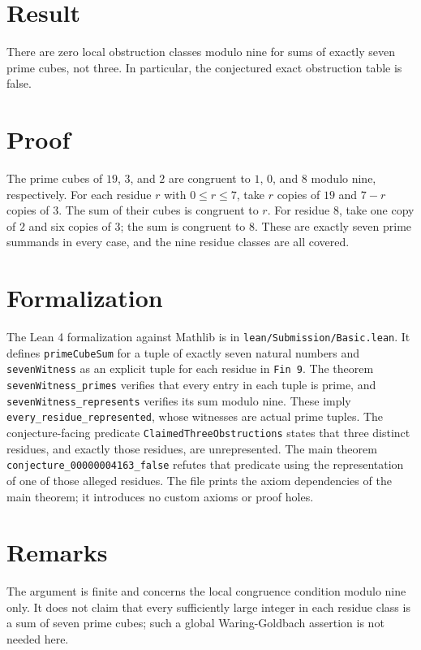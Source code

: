 \documentclass[11pt]{article}
\theoremstyle{plain}
\theoremstyle{definition}
\theoremstyle{remark}
\begin{document}
\section{Result}


There are zero local obstruction classes modulo nine for sums of exactly seven prime cubes, not three. In particular, the conjectured exact obstruction table is false.

\section{Proof}

The prime cubes of $19$, $3$, and $2$ are congruent to $1$, $0$, and $8$ modulo nine, respectively. For each residue $r$ with $0\leq r\leq 7$, take $r$ copies of $19$ and $7-r$ copies of $3$. The sum of their cubes is congruent to $r$. For residue $8$, take one copy of $2$ and six copies of $3$; the sum is congruent to $8$. These are exactly seven prime summands in every case, and the nine residue classes are all covered.

\section{Formalization}

The Lean 4 formalization against Mathlib is in \verb|lean/Submission/Basic.lean|. It defines \verb|primeCubeSum| for a tuple of exactly seven natural numbers and \verb|sevenWitness| as an explicit tuple for each residue in \verb|Fin 9|. The theorem \verb|sevenWitness_primes| verifies that every entry in each tuple is prime, and \verb|sevenWitness_represents| verifies its sum modulo nine. These imply \verb|every_residue_represented|, whose witnesses are actual prime tuples. The conjecture-facing predicate \verb|ClaimedThreeObstructions| states that three distinct residues, and exactly those residues, are unrepresented. The main theorem \verb|conjecture_00000004163_false| refutes that predicate using the representation of one of those alleged residues. The file prints the axiom dependencies of the main theorem; it introduces no custom axioms or proof holes.

\section{Remarks}


The argument is finite and concerns the local congruence condition modulo nine only. It does not claim that every sufficiently large integer in each residue class is a sum of seven prime cubes; such a global Waring-Goldbach assertion is not needed here.
\end{document}
